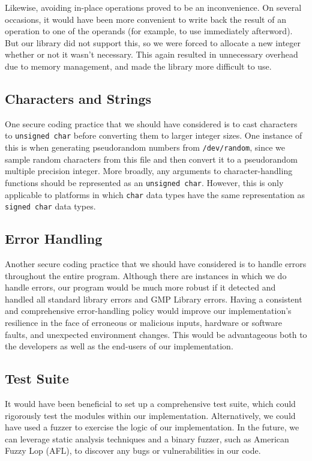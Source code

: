 \documentclass[a4paper]{article}
\begin{document}
Likewise, avoiding in-place operations proved to be an inconvenience. On several occasions, it would have been more convenient to write back the result of an operation to one of the operands (for example, to use immediately afterword). But our library did not support this, so we were forced to allocate a new integer whether or not it wasn't necessary. This again resulted in unnecessary overhead due to memory management, and made the library more difficult to use.

\subsection{Characters and Strings}

One secure coding practice that we should have considered is to cast characters to {\tt unsigned char} before converting them to larger integer sizes. One instance of this is when generating pseudorandom numbers from {\tt /dev/random}, since we sample random characters from this file and then convert it to a pseudorandom multiple precision integer. More broadly, any arguments to character-handling functions should be represented as an {\tt unsigned char}.
However, this is only applicable to platforms in which {\tt char} data types have the same representation as {\tt signed char} data types.

\subsection{Error Handling}

Another secure coding practice that we should have considered is to handle errors throughout the entire program. Although there are instances in which we do handle errors, our program would be much more robust if it detected and handled all standard library errors and GMP Library errors. Having a consistent and comprehensive error-handling policy would improve our implementation's resilience in the face of erroneous or malicious inputs, hardware or software faults, and
unexpected environment changes. This would be advantageous both to the developers as well as the end-users of our implementation.

\subsection{Test Suite}

It would have been beneficial to set up a comprehensive test suite, which could rigorously test the modules within our implementation. Alternatively, we could have used a fuzzer to exercise the logic of our implementation. In the future, we can leverage static analysis techniques and a binary fuzzer, such as American Fuzzy Lop (AFL), to discover any bugs or vulnerabilities in our code.
\end{document}
